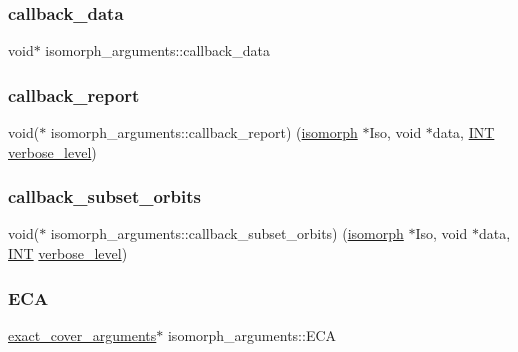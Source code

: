 \subsubsection{\texorpdfstring{callback\+\_\+data}{callback\_data}}
{\footnotesize\ttfamily void$\ast$ isomorph\+\_\+arguments\+::callback\+\_\+data}

\mbox{\label{classisomorph__arguments_aec21d9b73f1bd4182fc1f398f35c6921}} 
\subsubsection{\texorpdfstring{callback\+\_\+report}{callback\_report}}
{\footnotesize\ttfamily void($\ast$ isomorph\+\_\+arguments\+::callback\+\_\+report) (\mbox{\hyperlink{classisomorph}{isomorph}} $\ast$Iso, void $\ast$data, \mbox{\hyperlink{galois_8h_a09fddde158a3a20bd2dcadb609de11dc}{I\+NT}} \mbox{\hyperlink{simeon_8_c_a818073fbcc2f439e7c56952f67386122}{verbose\+\_\+level}})}

\mbox{\label{classisomorph__arguments_ac41f99402493e576e9f79391609fd5e4}} 
\subsubsection{\texorpdfstring{callback\+\_\+subset\+\_\+orbits}{callback\_subset\_orbits}}
{\footnotesize\ttfamily void($\ast$ isomorph\+\_\+arguments\+::callback\+\_\+subset\+\_\+orbits) (\mbox{\hyperlink{classisomorph}{isomorph}} $\ast$Iso, void $\ast$data, \mbox{\hyperlink{galois_8h_a09fddde158a3a20bd2dcadb609de11dc}{I\+NT}} \mbox{\hyperlink{simeon_8_c_a818073fbcc2f439e7c56952f67386122}{verbose\+\_\+level}})}

\mbox{\label{classisomorph__arguments_ac8cac0da7469d046e325b2612b3f98bb}} 
\subsubsection{\texorpdfstring{E\+CA}{ECA}}
{\footnotesize\ttfamily \mbox{\hyperlink{classexact__cover__arguments}{exact\+\_\+cover\+\_\+arguments}}$\ast$ isomorph\+\_\+arguments\+::\+E\+CA}

